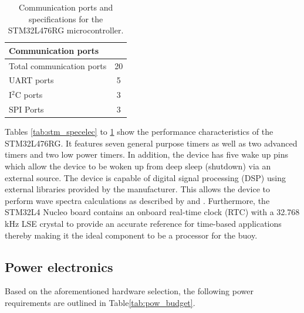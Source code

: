 \begin{table}[H]
	\centering
	\caption{Communication ports and specifications for the STM32L476RG microcontroller. }
	\setlength{\extrarowheight}{5pt}
	\begin{tabular}{l  c}
		\hline
		\multicolumn{2}{l}{\textbf{Communication ports}} \\
		\hline
		\hline
		Total communication ports & 20 \\
		\hline
		UART ports & 5 \\
		\hline
		I$^2$C ports & 3 \\
		\hline
		SPI Ports & 3 \\
		\hline
		\hline
	\end{tabular}
	
	\label{tab:stm_speccom}
\end{table}

Tables \ref{tab:stm_specelec} to \ref{tab:stm_speccom} show the performance characteristics of the STM32L476RG. It features seven general purpose timers as well as two advanced timers and two low power timers. In addition, the device has five wake up pins which allow the device to be woken up from deep sleep (shutdown) via an external source. The device is capable of  digital signal processing (DSP) using external libraries provided by the manufacturer. This allows the device to perform wave spectra calculations as described by \textcite{kuik1988method} and \textcite{earle1996nondirectional}. Furthermore, the STM32L4 Nucleo board contains an onboard real-time clock (RTC) with a 32.768 kHz LSE crystal to provide an accurate reference for time-based applications thereby making it the ideal component to be a processor for the buoy.

\subsection{Power electronics}

Based on the aforementioned hardware selection, the following power requirements are outlined in Table\ref{tab:pow_budget}.

